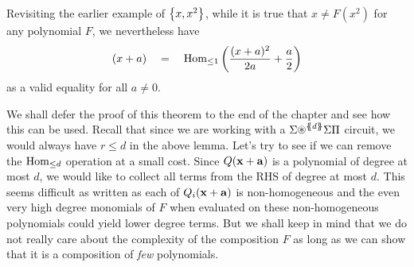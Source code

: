 \noindent
Revisiting the earlier example of $\left\{x,x^2\right\}$, while it is true that $x \neq F(x^2)$ for any polynomial $F$, we nevertheless have
\[
(x+a) \quad = \quad \operatorname{Hom}_{\leq 1}\left(\frac{(x+a)^2}{2a} + \frac{a}{2}\right)
\]
as a valid equality for all $a\neq 0$. 

\medskip 

We shall defer the proof of this theorem to the end of the chapter and see how this can be used.
Recall that since we are working with a $\SASP{d}$ circuit, we would always have $r \leq d$ in the above lemma. 
Let's try to see if we can remove the $\operatorname{Hom}_{\leq d}$ operation at a small cost.
Since $Q(\mathbf{x} + \mathbf{a})$ is a polynomial of degree at most $d$, we would like to collect all terms from the RHS of degree at most $d$.
This seems difficult as written as each of $Q_i(\mathbf{x} + \mathbf{a})$ is non-homogeneous and the even very high degree monomials of $F$ when evaluated on these non-homogeneous polynomials could yield lower degree terms.
But we shall keep in mind that we do not really care about the complexity of the composition $F$ as long as we can show that it is a composition of \emph{few} polynomials.

